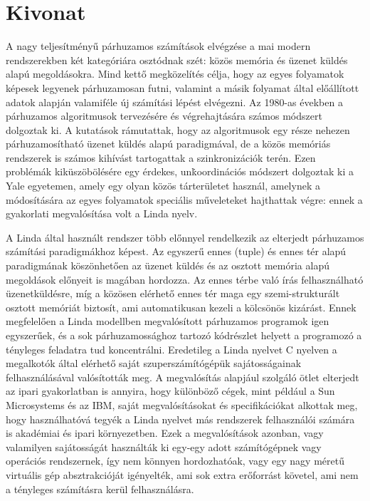 \setcounter{page}{1}

\selecthungarian

\chapter*{Kivonat}

A nagy teljesítményű párhuzamos számítások elvégzése a mai modern rendszerekben két kategóriára osztódnak szét: közös memória és üzenet küldés alapú megoldásokra. Mind kettő megközelítés célja, hogy az egyes folyamatok képesek legyenek párhuzamosan futni, valamint a másik folyamat által előállított adatok alapján valamiféle új számítási lépést elvégezni. Az 1980-as években a párhuzamos algoritmusok tervezésére és végrehajtására számos módszert dolgoztak ki. A kutatások rámutattak, hogy az algoritmusok egy része nehezen párhuzamosítható üzenet küldés alapú paradigmával, de a közös memóriás rendszerek is számos kihívást tartogattak a szinkronizációk terén. Ezen problémák kiküszöbölésére egy érdekes, un\. koordinációs módszert dolgoztak ki a Yale egyetemen, amely egy olyan közös tárterületet használ, amelynek a módosítására az egyes folyamatok speciális műveleteket hajthattak végre: ennek a gyakorlati megvalósítása volt a Linda nyelv.

A Linda által használt rendszer több előnnyel rendelkezik az elterjedt párhuzamos számítási paradigmákhoz képest. Az egyszerű ennes (tuple) és ennes tér alapú paradigmának köszönhetően az üzenet küldés és az osztott memória alapú megoldások előnyeit is magában hordozza. Az ennes térbe való írás felhasználható üzenetküldésre, míg a közösen elérhető ennes tér maga egy szemi-strukturált osztott memóriát biztosít, ami automatikusan kezeli a kölcsönös kizárást. Ennek megfelelően a Linda modellben megvalósított párhuzamos programok igen egyszerűek, és a sok párhuzamossághoz tartozó kódrészlet helyett a programozó a tényleges feladatra tud koncentrálni. Eredetileg a Linda nyelvet C nyelven a megalkotók által elérhető saját szuperszámítógépük sajátosságainak felhasználásával valósították meg. A megvalósítás alapjául szolgáló ötlet elterjedt az ipari gyakorlatban is annyira, hogy különböző cégek, mint például a Sun Microsystems és az IBM, saját megvalósításokat és specifikációkat alkottak meg, hogy használhatóvá tegyék a Linda nyelvet más rendszerek felhasználói számára is akadémiai és ipari környezetben. Ezek a megvalósítások azonban, vagy valamilyen sajátosságát használták ki egy-egy adott számítógépnek vagy operációs rendszernek, így nem könnyen hordozhatóak, vagy egy nagy méretű virtuális gép absztrakcióját igényelték, ami sok extra erőforrást követel, ami nem a tényleges számításra kerül felhasználásra.

